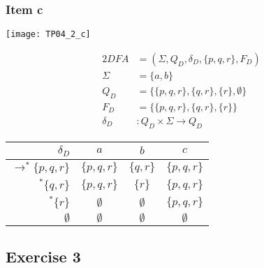 {\subsubsection{Item c} \label{sssec:TP04_2_c}
\begin{center} \texttt{[image: TP04\_2\_c]} \end{center}
\begin{center}
\begin{minipage}[c]{0.35\textwidth}
\begin{alignat*}{2}
	DFA       &= (\Sigma, Q_D, \delta_D, \{p,q,r\}, F_D)\\
	\Sigma    &= \{a,b\}\\
	Q_D       &= \{\{p,q,r\},\{q,r\},\{r\},\emptyset\}\\
	F_D       &= \{\{p,q,r\},\{q,r\},\{r\}\}\\
	\delta_D &\colon Q_D \times \Sigma \rightarrow Q_D
\end{alignat*}
\end{minipage}%
\begin{minipage}[c]{0.45\textwidth}
\begin{center}
\begin{tabular}{ r | c c c }
    $\delta_D$ & $a$ & $b$ & $c$ \\ \hline
    $\rightarrow^* \{p,q,r\}$ & $\{p,q,r\}$ & $\{  q,r\}$ & $\{p,q,r\}$ \\
    $           ^* \{  q,r\}$ & $\{p,q,r\}$ & $\{    r\}$ & $\{p,q,r\}$ \\
    $           ^* \{    r\}$ & $\emptyset$ & $\emptyset$ & $\{p,q,r\}$\\
    $ \emptyset                $ & $\emptyset$ & $\emptyset$ & $\emptyset$
\end{tabular}
\end{center}
\end{minipage}
\end{center}
\subsection{Exercise 3}
}
